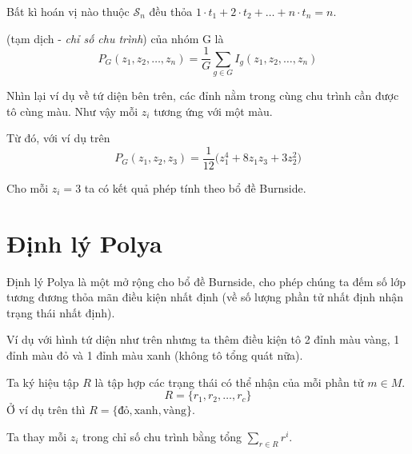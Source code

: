 \begin{remark}
    Bất kì hoán vị nào thuộc $\mathcal{S}_n$ đều thỏa $1 \cdot t_1 + 2 \cdot t_2 + \ldots + n \cdot t_n = n$.
\end{remark}

\begin{definition}
    (tạm dịch - \textit{chỉ số chu trình}) của nhóm G là
    \[P_G (z_1, z_2, \ldots, z_n) = \frac{1}{G}\sum_{g \in G} I_g (z_1, z_2, \ldots, z_n)\]
\end{definition}

Nhìn lại ví dụ về tứ diện bên trên, các đỉnh nằm trong cùng chu trình cần được tô cùng màu. Như vậy mỗi $z_i$ tương ứng với một màu.

Từ đó, với ví dụ trên
\[P_G(z_1, z_2, z_3) = \frac{1}{12}\big(z_1^4 + 8 z_1 z_3 + 3 z_2^2\big)\]

Cho mỗi $z_i = 3$ ta có kết quả phép tính theo bổ đề Burnside.

\section{Định lý Polya}

Định lý Polya là một mở rộng cho bổ đề Burnside, cho phép chúng ta đếm số lớp tương đương thỏa mãn điều kiện nhất định (về số lượng phần tử nhất định nhận trạng thái nhất định).

Ví dụ với hình tứ diện như trên nhưng ta thêm điều kiện tô 2 đỉnh màu vàng, 1 đỉnh màu đỏ và 1 đỉnh màu xanh (không tô tổng quát nữa).

Ta ký hiệu tập $R$ là tập hợp các trạng thái có thể nhận của mỗi phần tử $m \in M$.
\[R = \{r_1, r_2, \ldots, r_c \}\]
Ở ví dụ trên thì $R = \{\text{đỏ}, \text{xanh}, \text{vàng}\}$.

Ta thay mỗi $z_i$ trong chỉ số chu trình bằng tổng $\sum_{r \in R} r^i$.

